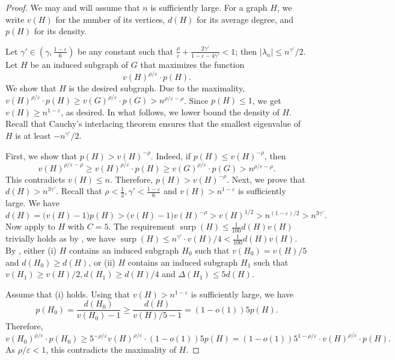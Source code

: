 \documentclass[11pt]{article}
\theoremstyle{plain}
\theoremstyle{definition}
\DeclareMathOperator{\surp}{surp}
\newcommand{\eps}{\varepsilon}
\begin{document}
\begin{proof}
    We may and will assume that $n$ is sufficiently large. 
    For a graph $H$, we write $v(H)$ for the number of its vertices, $d(H)$ for its average degree, and $p(H)$ for its density.

    Let $\gamma' \in (\gamma,\frac{1-\eps}{6})$ be any constant such that $\frac{\rho}{\eps} + \frac{2\gamma'}{1-\eps-4\gamma'} < 1$; then $|\lambda_n| \le n^{\gamma'}/2$.
    Let $H$ be an induced subgraph of $G$ that maximizes the function $$v(H)^{\rho/\eps}\cdot p(H).$$ 
    We show that $H$ is the desired subgraph. 
    Due to the maximality,  $v(H)^{\rho/\eps}\cdot p(H) \ge v(G)^{\rho/\eps}\cdot p(G)>n^{\rho/\eps-\rho}$.
    Since $p(H) \le 1$, we get $v(H) \geq  n^{1-\eps}$, as desired. 
    In what follows, we lower bound the density of $H$.
    Recall that Cauchy's interlacing theorem ensures that the smallest eigenvalue of $H$ is at least $-n^{\gamma'}/2$.
    
    First, we show that $p(H) > v(H)^{-\rho}$.
    Indeed, if $p(H) \le v(H)^{-\rho}$, then $$v(H)^{\rho/\eps-\rho}\ge v(H)^{\rho/\eps}\cdot p(H) \ge v(G)^{\rho/\eps}\cdot p(G)>n^{\rho/\eps-\rho}.$$
    This contradicts $v(H) \le n$. 
    Therefore, $p(H) > v(H)^{-\rho}$. 
    Next, we prove that $d(H) > n^{3\gamma'}$. Recall that $\rho<\frac{1}{2},\gamma'<\frac{1-\eps}{6}$ and $v(H) > n^{1-\eps}$ is sufficiently large.
    We have $$
        d(H) = \big(v(H)-1 \big)p(H) > \big(v(H)-1 \big)v(H)^{-\rho}>v(H)^{1/2}> n^{(1-\eps)/2}>n^{3\gamma'}.
    $$
    Now apply  to $H$ with $C=5$.
    The requirement $\surp(H) \le \frac{1}{100}d(H) v(H)$ trivially holds as by , we have $\surp(H) \le n^{\gamma'}\cdot v(H)/4< \frac{1}{100}d(H)v(H)$.
    By , either (i) $H$ contains an induced subgraph $H_0$ such that $v(H_0) = v(H)/5$ and $d(H_0) \ge d(H)$, or (ii) $H$ contains an induced subgraph $H_1$ such that $v(H_1) \ge v(H)/2, d(H_1) \ge d(H)/4$ and $\Delta(H_1) \le 5d(H)$.
    
    Assume that (i) holds. Using that $v(H)>n^{1-\eps}$ is sufficiently large, we have $$p(H_0) = \frac{d(H_0)}{v(H_0)-1} \ge \frac{d(H)}{v(H)/5-1}=(1-o(1))5p(H).$$
    Therefore, $$v(H_0)^{\rho/\eps}\cdot p(H_0)
        \ge 5^{-\rho/\eps}v(H)^{\rho/\eps}\cdot (1-o(1))5p(H)
        = (1-o(1)){5^{1-\rho/\eps}}\cdot v(H)^{\rho/\eps}\cdot p(H).$$
    As $\rho/\eps < 1$, this contradicts the maximality of $H$. 
   

\end{proof}
\end{document}

